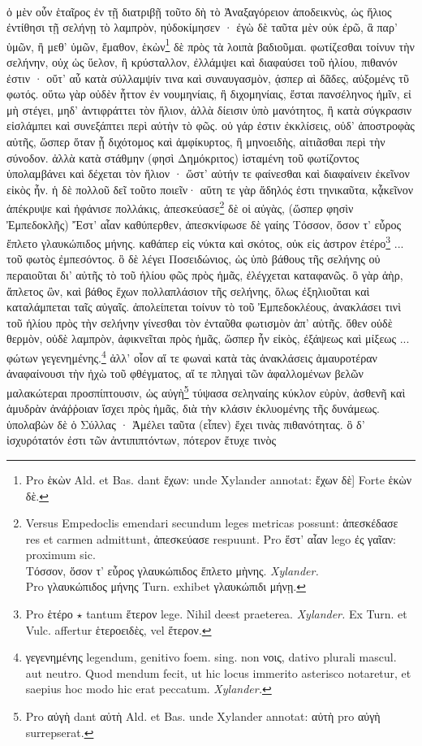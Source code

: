 \documentclass[a4paper, 11pt, oneside, polutonikogreek, german]{article}
\begin{document}
\paragraph{}
ὁ μὲν οὖν ἑταῖρος ἐν τῇ διατριβῇ τοῦτο δὴ τὸ Ἀναξαγόρειον ἀποδεικνὺς, ὡς ἥλιος ἐντίθησι τῇ σελήνῃ τὸ λαμπρὸν, ηὐδοκίμησεν · ἐγὼ δὲ ταῦτα μὲν οὐκ ἐρῶ, ἃ παρ' ὑμῶν, ἢ μεθ' ὑμῶν, ἔμαθον, ἑκὼν\footnote{Pro ἑκὼν Ald. et Bas. dant ἔχων: unde Xylander annotat: ἔχων δὲ] Forte ἑκὼν δὲ.} δὲ πρὸς τὰ λοιπὰ βαδιοῦμαι. φωτίζεσθαι τοίνυν τὴν σελήνην, οὐχ ὡς ὕελον, ἢ κρύσταλλον, ἐλλάμψει καὶ διαφαύσει τοῦ ἡλίου, πιθανόν ἐστιν · οὔτ' αὖ κατὰ σύλλαμψίν τινα καὶ συναυγασμὸν, ᾴσπερ αὶ δᾶδες, αὐξομένς τῦ φωτός. οὕτω γὰρ οὐδὲν ἧττον ἐν νουμηνίαις, ἢ διχομηνίαις, ἔσται πανσέληνος ἡμῖν, εἰ μὴ στέγει, μηδ' ἀντιφράττει τὸν ἥλιον, ἀλλὰ δίεισιν ὑπὸ μανότητος, ἢ κατὰ σύγκρασιν εἰσλάμπει καὶ συνεξάπτει περὶ αὐτὴν τὸ φῶς. οὐ γάρ ἐστιν ἐκκλίσεις, οὐδ' ἀποστροφὰς αὐτῆς, ὥσπερ ὅταν ᾖ διχότομος καὶ ἀμφίκυρτος, ἢ μηνοειδὴς, αἰτιᾶσθαι περὶ τὴν σύνοδον. ἀλλὰ κατὰ στάθμην (φησὶ Δημόκριτος) ἱσταμένη τοῦ φωτίζοντος ὑπολαμβάνει καὶ δέχεται τὸν ἥλιον · ὥστ' αὐτήν τε φαίνεσθαι καὶ διαφαίνειν ἐκεῖνον εἰκὸς ἦν. ἡ δὲ πολλοῦ δεῖ τοῦτο ποιεῖν· αὕτη τε γὰρ ἄδηλός ἐστι τηνικαῦτα, κᾆκεῖνον ἀπέκρυψε καὶ ἠφάνισε πολλάκις, ἀπεσκεύασε\footnote{Versus Empedoclis emendari secundum leges metricas possunt: ἀπεσκέδασε res et carmen admittunt, ἀπεσκεύασε respuunt. Pro ἕστ' αἶαν lego ἐς γαῖαν: proximum sic.\\\hspace*{5mm}Τόσσον, ὅσον τ' εὖρος γλαυκώπιδος ἕπλετο μὴνης. \emph{Xylander.}\\\hspace*{5mm}Pro γλαυκώπιδος μήνης Turn. exhibet γλαυκώπιδι μήνῃ.} δὲ οἱ αὐγὰς, (ὥσπερ φησὶν Ἐμπεδοκλῆς) Ἔστ' αἶαν καθύπερθεν, ἀπεσκνίφωσε δὲ γαίης Τόσσον, ὅσον τ' εὖρος ἔπλετο γλαυκώπιδος μήνης. καθάπερ εἰς νύκτα καὶ σκότος, οὐκ εἰς ἀστρον ἑτέρο\footnote{Pro ἑτέρο $\star$ tantum ἕτερον lege. Nihil deest praeterea. \emph{Xylander.} Ex Turn. et Vulc. affertur ἑτεροειδὲς, vel ἕτερον.} ... τοῦ φωτὸς ἐμπεσόντος. ὃ δὲ λέγει Ποσειδώνιος, ὡς ὑπὸ βάθους τῆς σελήνης οὐ περαιοῦται δι' αὐτῆς τὸ τοῦ ἡλίου φῶς πρὸς ἡμᾶς, ἐλέγχεται καταφανῶς. ὃ γὰρ ἀὴρ, ἄπλετος ὢν, καὶ βάθος ἔχων πολλαπλάσιον τῆς σελήνης, ὅλως ἐξηλιοῦται καὶ καταλάμπεται ταῖς αὐγαῖς. ἀπολείπεται τοίνυν τὸ τοῦ Ἐμπεδοκλέους, ἀνακλάσει τινὶ τοῦ ἡλίου πρὸς τὴν σελήνην γίνεσθαι τὸν ἐνταῦθα φωτισμὸν ἀπ' αὐτῆς. ὅθεν οὐδὲ θερμὸν, οὐδὲ λαμπρὸν, ἀφικνεῖται πρὸς ἡμᾶς, ὥσπερ ἦν εἰκὸς, ἐξάψεως καὶ μίξεως ... φώτων γεγενημένης.\footnote{γεγενημένης legendum, genitivo foem. sing. non νοις, dativo plurali mascul. aut neutro. Quod mendum fecit, ut hic locus immerito asterisco notaretur, et saepius hoc modo hic erat peccatum. \emph{Xylander.}} ἀλλ' οἷον αἵ τε φωναὶ κατὰ τὰς ἀνακλάσεις ἀμαυροτέραν ἀναφαίνουσι τὴν ἠχὼ τοῦ φθέγματος, αἵ τε πληγαὶ τῶν ἀφαλλομένων βελῶν μαλακώτεραι προσπίπτουσιν, ὡς αὐγὴ\footnote{Pro αὐγὴ dant αὐτὴ Ald. et Bas. unde Xylander annotat: αὐτὴ pro αὐγὴ surrepserat.} τύψασα σεληναίης κύκλον εὐρὺν, ἀσθενῆ καὶ ἀμυδρὰν ἀνάῤῥοιαν ἴσχει πρὸς ἡμᾶς, διὰ τὴν κλάσιν ἐκλυομένης τῆς δυνάμεως. ὑπολαβὼν δὲ ὁ Σύλλας · Ἀμέλει ταῦτα (εἶπεν) ἔχει τινὰς πιθανότητας. ὃ δ' ἰσχυρότατόν ἐστι τῶν ἀντιπιπτόντων, πότερον ἔτυχε τινὸς 
\end{document}
